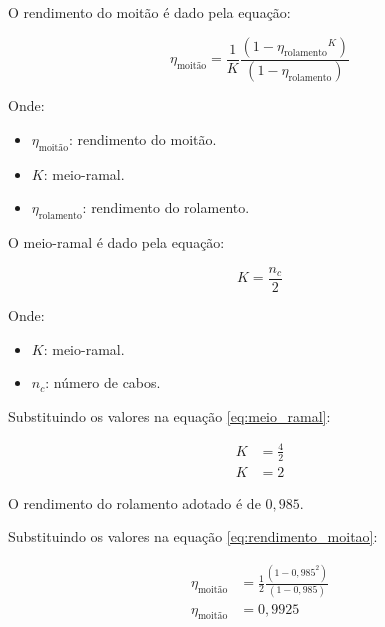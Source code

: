 
O rendimento do moitão é dado pela equação:

\begin{equation}
  \eta_{\text{moitão}} = \frac{1}{K}\frac{\left(1-{\eta_{\text{rolamento}}}^K\right)}{\left(1-\eta_{\text{rolamento}}\right)}
  \label{eq:rendimento_moitao}
\end{equation}

Onde:

\begin{itemize}[leftmargin=1.25cm]
  \item $\eta_{\text{moitão}}$: rendimento do moitão.
  \item $K$: meio-ramal.
  \item $\eta_{\text{rolamento}}$: rendimento do rolamento.
\end{itemize}

\vspace{1em}

O meio-ramal é dado pela equação:

\begin{equation}
  K = \frac{n_c}{2}
  \label{eq:meio_ramal}
\end{equation}

Onde:

\begin{itemize}[leftmargin=1.25cm]
  \item $K$: meio-ramal.
  \item $n_c$: número de cabos.
\end{itemize}

\vspace{1em}

Substituindo os valores na equação \eqref{eq:meio_ramal}:

\begin{align*}
  K & = \frac{4}{2} \\
  K & = \boxed{2}
\end{align*}

O rendimento do rolamento adotado é de $0{,}985$.

Substituindo os valores na equação \eqref{eq:rendimento_moitao}:

\begin{align*}
  \eta_{\text{moitão}} & = \frac{1}{2}\frac{\left(1-0{,}985^2\right)}{\left(1-0{,}985\right)} \\
  \eta_{\text{moitão}} & = \boxed{0{,}9925}
\end{align*}
